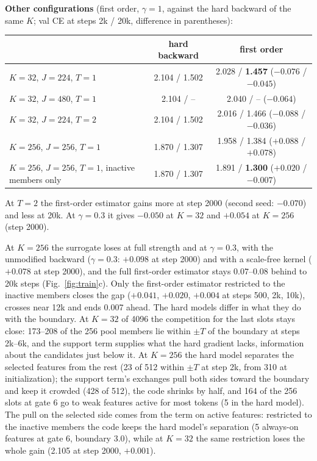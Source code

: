 \documentclass[10pt,a4paper]{article}
\begin{document}
\textbf{Other configurations} (first order, \(\gamma=1\), against the hard backward of the same \(K\); val CE at
steps 2k / 20k, difference in parentheses):

\begin{center}\small
\begin{tabular}{lcc}
\toprule
 & hard backward & first order \\
\midrule
\(K=32\), \(J=224\), \(T=1\)  & 2.104 / 1.502 & 2.028 / \textbf{1.457} (\(-0.076\) / \(\mathbf{-0.045}\)) \\
\(K=32\), \(J=480\), \(T=1\)  & 2.104 / --    & 2.040 / -- (\(-0.064\)) \\
\(K=32\), \(J=224\), \(T=2\)  & 2.104 / 1.502 & 2.016 / 1.466 (\(-0.088\) / \(-0.036\)) \\
\(K=256\), \(J=256\), \(T=1\) & 1.870 / 1.307 & 1.958 / 1.384 (\(+0.088\) / \(+0.078\)) \\
\(K=256\), \(J=256\), \(T=1\), inactive members only & 1.870 / 1.307 & 1.891 / \textbf{1.300} (\(+0.020\) / \(\mathbf{-0.007}\)) \\
\bottomrule
\end{tabular}
\end{center}

At \(T=2\) the first-order estimator gains more at step 2000 (second seed: \(-0.070\)) and less at 20k.  At
\(\gamma=0.3\) it gives \(-0.050\) at \(K=32\) and \(+0.054\) at \(K=256\) (step 2000).

At \(K=256\) the surrogate loses at full strength and at \(\gamma=0.3\), with the unmodified backward (\(\gamma=0.3\):
\(+0.098\) at step 2000) and with a scale-free kernel (\(+0.078\) at step 2000), and the full first-order estimator stays
\(0.07\)--\(0.08\) behind to 20k steps (Fig.~\ref{fig:train}c).  Only the first-order estimator restricted to the inactive
members closes the gap (\(+0.041\), \(+0.020\), \(+0.004\) at steps 500, 2k, 10k), crosses near 12k and ends 0.007 ahead.  The hard models differ in what they do with the boundary.  At \(K=32\) of 4096 the
competition for the last slots stays close: 173--208 of the 256 pool members lie within \(\pm T\) of the boundary at
steps 2k--6k, and the support term supplies what the hard gradient lacks, information about the candidates just
below it.  At \(K=256\) the hard model separates the selected features from the rest (23 of 512 within \(\pm T\) at step
2k, from 310 at initialization); the support term's exchanges pull both sides toward the boundary and keep it
crowded (428 of 512), the code shrinks by half, and 164 of the 256 slots at gate 6 go to weak features active for
most tokens (5 in the hard model).  The pull on the selected side comes from the term on active features: restricted
to the inactive members the code keeps the hard model's separation (5 always-on features at gate 6, boundary 3.0),
while at \(K=32\) the same restriction loses the whole gain (2.105 at step 2000, \(+0.001\)).
\end{document}
